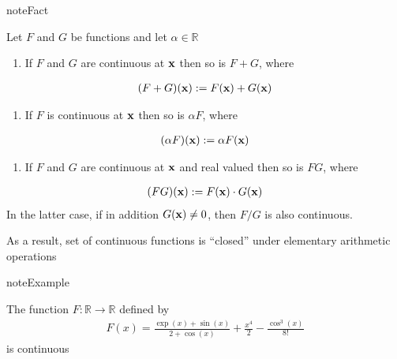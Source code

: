 \documentclass[letterpaper,10pt,english]{jupyterBook}
\begin{document}
\begin{sphinxadmonition}{note}{Fact}

\sphinxAtStartPar
Let \(F\) and \(G\) be functions and let \(\alpha \in \mathbb{R}\)
\begin{enumerate}
%
\item {} 
\sphinxAtStartPar
If \(F\) and \(G\) are continuous at \({\bf x}\) then so is \(F + G\),
where

\end{enumerate}
\begin{equation*}
\begin{split}
%
(F + G)({\bf x}) := F({\bf x}) + G({\bf x})
%
\end{split}
\end{equation*}\begin{enumerate}
%
\setcounter{enumi}{1}
\item {} 
\sphinxAtStartPar
If \(F\) is continuous at \({\bf x}\) then so is \(\alpha F\), where

\end{enumerate}
\begin{equation*}
\begin{split}
%
(\alpha F)({\bf x}) := \alpha F({\bf x})
%
\end{split}
\end{equation*}\begin{enumerate}
%
\setcounter{enumi}{2}
\item {} 
\sphinxAtStartPar
If \(F\) and \(G\) are continuous at \({\bf x}\) and real valued then so is
\(FG\), where

\end{enumerate}
\begin{equation*}
\begin{split}
%
(FG)({\bf x}) := F({\bf x}) \cdot G({\bf x})
%
\end{split}
\end{equation*}
\sphinxAtStartPar
In the latter case, if in addition \(G({\bf x}) \ne 0\), then \(F/G\) is also continuous.
\end{sphinxadmonition}

\sphinxAtStartPar
As a result, set of continuous functions is “closed” under elementary
arithmetic operations

\begin{sphinxadmonition}{note}{Example}

\sphinxAtStartPar
The function \(F \colon \mathbb{R} \to \mathbb{R}\) defined by
\begin{equation*}
\begin{split}
%
F(x) = \frac{\exp(x) + \sin(x)}{2 + \cos(x)} + \frac{x^4}{2}
- \frac{\cos^3(x)}{8!}
%
\end{split}
\end{equation*}
\sphinxAtStartPar
is continuous
\end{sphinxadmonition}
\end{document}
